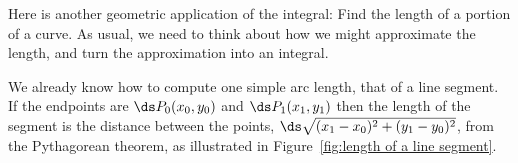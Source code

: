 %
%


















Here is another geometric application of the integral: Find the length
of a portion of a curve. As usual, we need to think about how we might
approximate the length, and turn the approximation into an integral.

We already know how to compute one simple arc length, that of a line
segment. If the endpoints are $\ds P_0(x_0,y_0)$ and $\ds P_1(x_1,y_1)$
then the length of the segment is the distance between the points,
$\ds \sqrt{(x_1-x_0)^2+(y_1-y_0)^2}$, from the Pythagorean theorem, as
illustrated in Figure~\ref{fig:length of a line segment}.

